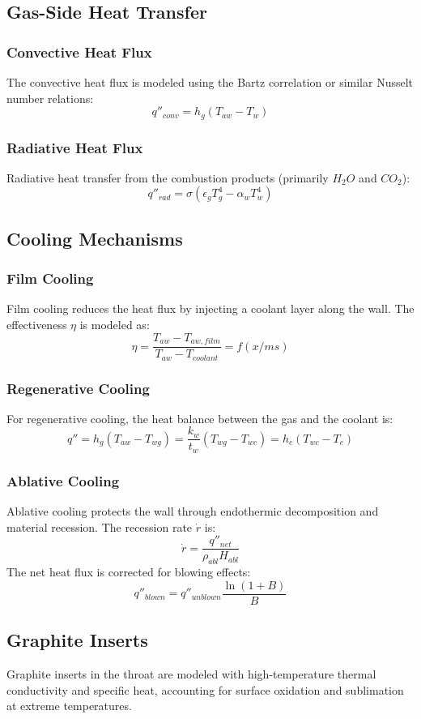 \subsection{Gas-Side Heat Transfer}

\subsubsection{Convective Heat Flux}
The convective heat flux is modeled using the Bartz correlation or similar Nusselt number relations:
\begin{equation}
q''_{conv} = h_g (T_{aw} - T_w)
\end{equation}

\subsubsection{Radiative Heat Flux}
Radiative heat transfer from the combustion products (primarily $H_2O$ and $CO_2$):
\begin{equation}
q''_{rad} = \sigma (\epsilon_g T_g^4 - \alpha_w T_w^4)
\end{equation}

\subsection{Cooling Mechanisms}

\subsubsection{Film Cooling}
Film cooling reduces the heat flux by injecting a coolant layer along the wall. The effectiveness $\eta$ is modeled as:
\begin{equation}
\eta = \frac{T_{aw} - T_{aw,film}}{T_{aw} - T_{coolant}} = f(x/ms)
\end{equation}

\subsubsection{Regenerative Cooling}
For regenerative cooling, the heat balance between the gas and the coolant is:
\begin{equation}
q'' = h_g (T_{aw} - T_{wg}) = \frac{k_w}{t_w} (T_{wg} - T_{wc}) = h_c (T_{wc} - T_c)
\end{equation}

\subsubsection{Ablative Cooling}
Ablative cooling protects the wall through endothermic decomposition and material recession. The recession rate $\dot{r}$ is:
\begin{equation}
\dot{r} = \frac{q''_{net}}{\rho_{abl} H_{abl}}
\end{equation}
The net heat flux is corrected for blowing effects:
\begin{equation}
q''_{blown} = q''_{unblown} \frac{\ln(1+B)}{B}
\end{equation}

\subsection{Graphite Inserts}
Graphite inserts in the throat are modeled with high-temperature thermal conductivity and specific heat, accounting for surface oxidation and sublimation at extreme temperatures.
